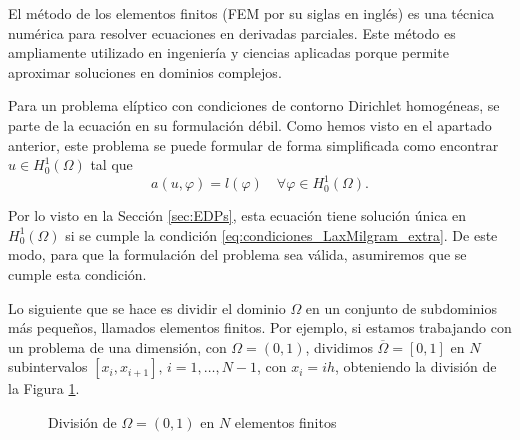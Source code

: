 \documentclass[a4paper,11pt,spanish, twoside, leqno]{tfg-uam}
\theoremstyle{definition}
\begin{document}
El método de los elementos finitos (FEM por su siglas en inglés) es una técnica numérica para resolver ecuaciones en derivadas parciales. Este método es ampliamente utilizado en ingeniería y ciencias aplicadas porque permite aproximar soluciones en dominios complejos.

Para un problema elíptico con condiciones de contorno Dirichlet homogéneas, se parte de la ecuación en su formulación débil. Como hemos visto en el apartado anterior, este problema se puede formular de forma simplificada como encontrar $u\in H_0^1(\Omega)$ tal que
\begin{equation*}
    a(u,\varphi) = l(\varphi) \quad \forall \varphi\in  H_0^1(\Omega).
\end{equation*}

Por lo visto en la Sección \ref{sec:EDPs}, esta ecuación tiene solución única en $H_0^1(\Omega)$ si se cumple la condición \eqref{eq:condiciones_LaxMilgram_extra}. De este modo, para que la formulación del problema sea válida, asumiremos que se cumple esta condición.

Lo siguiente que se hace es dividir el dominio $\Omega$ en un conjunto de subdominios más pequeños, llamados elementos finitos. Por ejemplo, si estamos trabajando con un problema de una dimensión, con $\Omega =(0,1)$, dividimos $\overline{\Omega} = [0,1]$ en $N$ subintervalos $[x_i,x_{i+1}], \, i = 1, \dots, N-1$, con $x_i = ih$, obteniendo la división de la Figura \ref{fig:DivisionOmega}.

\begin{figure}
    \centering
    \caption{División de $\Omega = (0,1)$ en $N$ elementos finitos}
    \label{fig:DivisionOmega}
\end{figure}
\end{document}
